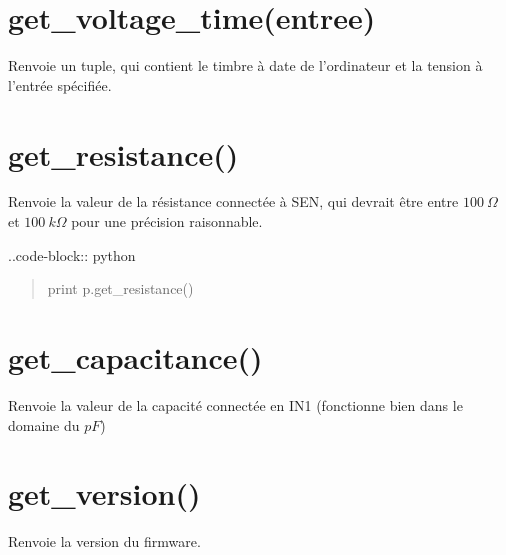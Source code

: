 \documentclass[a4paper,12pt,french]{sphinxmanual}
\begin{document}
\section{get\_voltage\_time(entree)}
\label{\detokenize{7.1:get-voltage-time-entree}}
Renvoie un tuple, qui contient le timbre à date de l’ordinateur et
la tension à l’entrée spécifiée.

\begin{sphinxVerbatim}[commandchars=\\\{\}]
 
\end{sphinxVerbatim}


\section{get\_resistance()}
\label{\detokenize{7.1:get-resistance}}
Renvoie la valeur de la résistance connectée à SEN, qui devrait être
entre \(100~\Omega\) et \(100~k\Omega\) pour une précision raisonnable.

..code-block:: python
\begin{quote}

print p.get\_resistance()
\end{quote}


\section{get\_capacitance()}
\label{\detokenize{7.1:get-capacitance}}
Renvoie la valeur de la capacité connectée en IN1 (fonctionne bien
dans le domaine du \(pF\))

\begin{sphinxVerbatim}[commandchars=\\\{\}]
 
\end{sphinxVerbatim}


\section{get\_version()}
\label{\detokenize{7.1:get-version}}
Renvoie la version du firmware.

\begin{sphinxVerbatim}[commandchars=\\\{\}]
 
\end{sphinxVerbatim}
\end{document}
